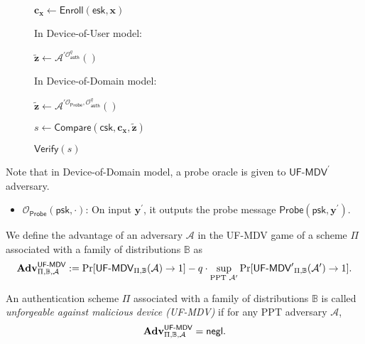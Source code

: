 \begin{figure}[h]
\begin{multicols}{2}
\begin{minipage}[t]{0.9\linewidth}
\begin{algorithm}[H]
\begin{algorithmic}[1]
		\State $\mathbf{c_x} \gets \textsf{Enroll}(\textsf{esk}, \mathbf{x})$

		\State In Device-of-User model:
		
		\State \hspace{\algorithmicindent} ${\mathbf{\tilde{z}}} \gets \mathcal{A}^{\prime \mathcal{O}_\textsf{auth}^q}()$

		\State In Device-of-Domain model:

		\State \hspace{\algorithmicindent} ${\mathbf{\tilde{z}}} \gets \mathcal{A}^{\prime \mathcal{O}_\textsf{Probe}, \mathcal{O}_\textsf{auth}^q}()$
		
		\State $s \gets \textsf{Compare}( \textsf{csk}, \mathbf{c_x}, \mathbf{\tilde{z}} )$

		\State \Return $\textsf{Verify}(s)$
	\end{algorithmic}
	\end{algorithm}
	\end{minipage}

\end{multicols}
\label{fig:uf-mdv_game}
\end{figure}

Note that in Device-of-Domain model, a probe oracle is given to $\textsf{UF-MDV}^\prime$ adversary.

\begin{itemize}
	\item $\mathcal{O}_\textsf{Probe}(\textsf{psk}, \cdot)$: On input $\mathbf{y}^\prime$, it outputs the probe message $\textsf{Probe}(\textsf{psk}, \mathbf{y}^\prime)$.
\end{itemize}

We define the advantage of an adversary $\mathcal{A}$ in the \textsf{UF-MDV} game of a scheme $\Pi$ associated with a family of distributions $\mathbb{B}$ as
\[
	\mathbf{Adv}^{\textsf{UF-MDV}}_{\Pi, \mathbb{B}, \mathcal{A}} := \Pr[{\textsf{UF-MDV}}_{\Pi, \mathbb{B}}(\mathcal{A}) \to 1] -
	q \cdot \sup_{\text{PPT } \mathcal{A}^\prime} \Pr[{\textsf{UF-MDV}^\prime}_{\Pi, \mathbb{B}}(\mathcal{A}^\prime) \to 1].
\]

An authentication scheme $\Pi$ associated with a family of distributions $\mathbb{B}$ is called \emph{unforgeable against malicious device (UF-MDV)} if for any PPT adversary $\mathcal{A}$,
\[
	\mathbf{Adv}^{\textsf{UF-MDV}}_{\Pi, \mathbb{B}, \mathcal{A}} = \mathsf{negl}.
\]



